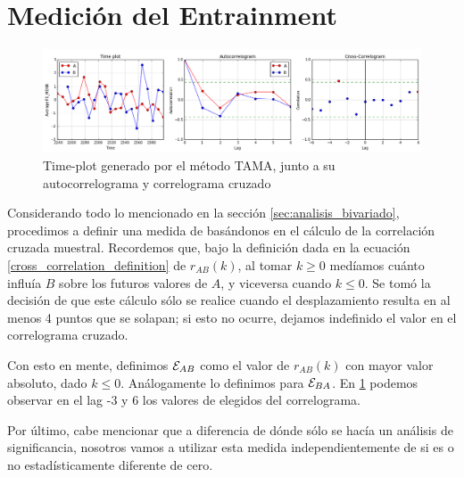 \section{Medición del Entrainment}
\label{sec:method_entrainment}

\begin{figure}
\centering
\includegraphics[width=15cm]{images/time_plot_with_cross_correlation.png}
\caption{Time-plot generado por el método TAMA, junto a su autocorrelograma y correlograma cruzado}
\label{fig:time_plot_with_bivariate}
\end{figure}

Considerando todo lo mencionado en la sección \ref{sec:analisis_bivariado}, procedimos a definir una medida de \entrainment basándonos en el cálculo de la correlación cruzada muestral. Recordemos que, bajo la definición dada en la ecuación \ref{cross_correlation_definition} de $r_{AB}(k)$, al tomar $k \geq 0$ medíamos cuánto influía $B$ sobre los futuros valores de $A$, y viceversa cuando $k \leq 0$. Se tomó la decisión de que este cálculo sólo se realice cuando el desplazamiento resulta en al menos 4 puntos que se solapan; si esto no ocurre, dejamos indefinido el valor en el correlograma cruzado.

Con esto en mente, definimos $\mathcal{E}_{AB}$ como el valor de $r_{AB}(k)$ con mayor valor absoluto, dado $k \leq 0$. Análogamente lo definimos para $\mathcal{E}_{BA}$. En \ref{fig:time_plot_with_bivariate} podemos observar en el lag -3 y 6 los valores de \entrainment elegidos del correlograma.

Por último, cabe mencionar que a diferencia de \cite{KOU2008.2} dónde sólo se hacía un análisis de significancia, nosotros vamos a utilizar esta medida independientemente de si es o no estadísticamente diferente de cero.
